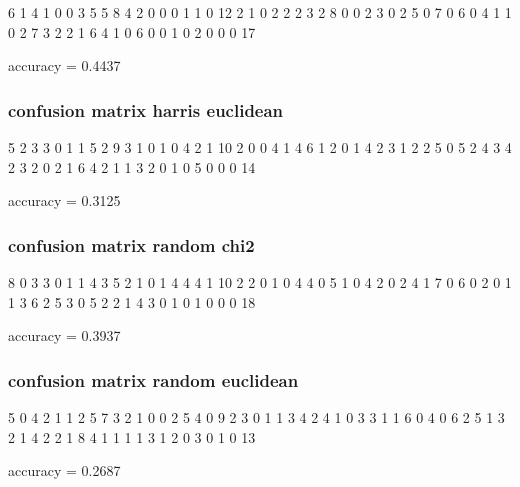 \documentclass[12pt]{article}
\begin{document}
     6     1     4     1     0     0     3     5
     5     8     4     2     0     0     0     1
     1     0    12     2     1     0     2     2
     2     3     2     8     0     0     2     3
     0     2     5     0     7     0     6     0
     4     1     1     0     2     7     3     2
     2     1     6     4     1     0     6     0
     0     1     0     2     0     0     0    17


accuracy = 0.4437


\subsubsection{confusion matrix harris euclidean}

     5     2     3     3     0     1     1     5
     2     9     3     1     0     1     0     4
     2     1    10     2     0     0     4     1
     4     6     1     2     0     1     4     2
     3     1     2     2     5     0     5     2
     4     3     4     2     3     2     0     2
     1     6     4     2     1     1     3     2
     0     1     0     5     0     0     0    14

accuracy = 
    0.3125

\subsubsection{confusion matrix random chi2}

     8     0     3     3     0     1     1     4
     3     5     2     1     0     1     4     4
     4     1    10     2     2     0     1     0
     4     4     0     5     1     0     4     2
     0     2     4     1     7     0     6     0
     2     0     1     1     3     6     2     5
     3     0     5     2     2     1     4     3
     0     1     0     1     0     0     0    18


accuracy = 0.3937

\subsubsection{confusion matrix random euclidean}


     5     0     4     2     1     1     2     5
     7     3     2     1     0     0     2     5
     4     0     9     2     3     0     1     1
     3     4     2     4     1     0     3     3
     1     1     6     0     4     0     6     2
     5     1     3     2     1     4     2     2
     1     8     4     1     1     1     1     3
     1     2     0     3     0     1     0    13


accuracy = 0.2687
\end{document}

